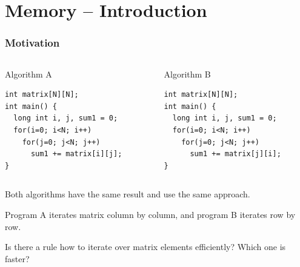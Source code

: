 \documentclass{beamer}
\subtitle{Lecture 04. Memory Hierarchy}
\author{Pavel Píša \phantom{xxxxxxx} Petr Štěpán \\ \small\texttt{pisa@fel.cvut.cz} \phantom{xx} \small\texttt{stepan@fel.cvut.cz} \\
\phantom{xxxxxxxxx} \\
License: CC-BY-SA}
\begin{document}
\maketitle

\section{Memory -- Introduction}

\begin{frame}[fragile]
\frametitle{Motivation}

\begin{columns}
\begin{column}{0.45\textwidth}
Algorithm A\\
\begin{verbatim}
int matrix[N][N];
int main() {
  long int i, j, sum1 = 0;
  for(i=0; i<N; i++)
    for(j=0; j<N; j++)
      sum1 += matrix[i][j];
}
\end{verbatim}
\end{column}
\hfill
\begin{column}{0.45\textwidth}
Algorithm B\\
\begin{verbatim}
int matrix[N][N];
int main() {
  long int i, j, sum1 = 0;
  for(i=0; i<N; i++)
    for(j=0; j<N; j++)
      sum1 += matrix[j][i];
}
\end{verbatim}
\end{column}
\end{columns}
\bigskip
Both algorithms have the same result and use the same approach.

Program A iterates matrix column by column, and program B iterates row by row.
\bigskip

Is there a rule how to iterate over matrix elements efficiently? Which one is faster?

\end{frame}
\end{document}
